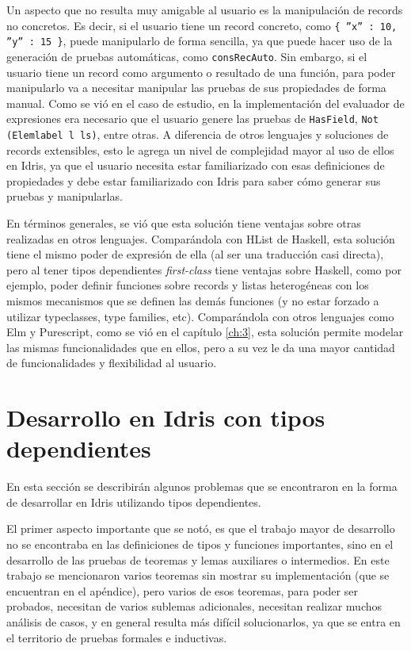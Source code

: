 Un aspecto que no resulta muy amigable al usuario es la manipulación de records no concretos. Es decir, si el usuario tiene un record concreto, como \texttt{\{ ''x'' : 10, ''y'' : 15 \}}, puede manipularlo de forma sencilla, ya que puede hacer uso de la generación de pruebas automáticas, como \texttt{consRecAuto}. Sin embargo, si el usuario tiene un record como argumento o resultado de una función, para poder manipularlo va a necesitar manipular las pruebas de sus propiedades de forma manual. Como se vió en el caso de estudio, en la implementación del evaluador de expresiones era necesario que el usuario genere las pruebas de \texttt{HasField}, \texttt{Not (Elemlabel l ls)}, entre otras. A diferencia de otros lenguajes y soluciones de records extensibles, esto le agrega un nivel de complejidad mayor al uso de ellos en Idris, ya que el usuario necesita estar familiarizado con esas definiciones de propiedades y debe estar familiarizado con Idris para saber cómo generar sus pruebas y manipularlas.

En términos generales, se vió que esta solución tiene ventajas sobre otras realizadas en otros lenguajes. Comparándola con HList de Haskell, esta solución tiene el mismo poder de expresión de ella (al ser una traducción casi directa), pero al tener tipos dependientes \textit{first-class} tiene ventajas sobre Haskell, como por ejemplo, poder definir funciones sobre records y listas heterogéneas con los mismos mecanismos que se definen las demás funciones (y no estar forzado a utilizar typeclasses, type families, etc). Comparándola con otros lenguajes como Elm y Purescript, como se vió en el capítulo \ref{ch:3}, esta solución permite modelar las mismas funcionalidades que en ellos, pero a su vez le da una mayor cantidad de funcionalidades y flexibilidad al usuario.

\section{Desarrollo en Idris con tipos dependientes}

En esta sección se describirán algunos problemas que se encontraron en la forma de desarrollar en Idris utilizando tipos dependientes.

El primer aspecto importante que se notó, es que el trabajo mayor de desarrollo no se encontraba en las definiciones de tipos y funciones importantes, sino en el desarrollo de las pruebas de teoremas y lemas auxiliares o intermedios. En este trabajo se mencionaron varios teoremas sin mostrar su implementación (que se encuentran en el apéndice), pero varios de esos teoremas, para poder ser probados, necesitan de varios sublemas adicionales, necesitan realizar muchos análisis de casos, y en general resulta más difícil solucionarlos, ya que se entra en el territorio de pruebas formales e inductivas.

